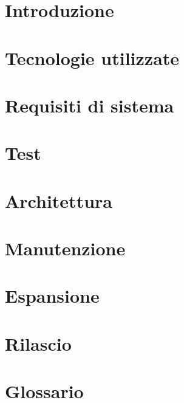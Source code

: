 \documentclass[]{article}
\begin{document}
	
	\newpage
	\tableofcontents
	\newpage
	\listoffigures
	\listoftables
	\newpage


	\section{Introduzione}
	
	\newpage

	\section{Tecnologie utilizzate}
	
	\newpage

	\section{Requisiti di sistema}
	
	\newpage

	\section{Test}
	
	\newpage

	\section{Architettura}
	
	\newpage

	\section{Manutenzione}
	
	\newpage

	\section{Espansione}
	
	\newpage

	\section{Rilascio}
	
	\newpage

	\appendix
	\section{Glossario}
	
	\newpage
\end{document}
